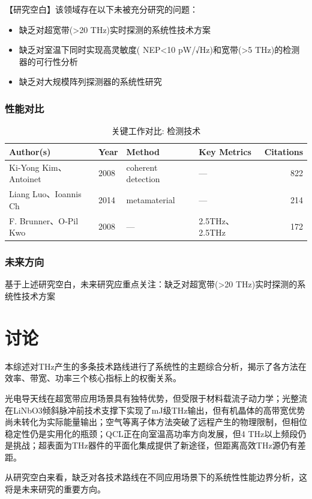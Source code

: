 \documentclass[reprint,amsmath,amssymb,aps,floatfix]{revtex4-2}
\begin{document}
\par\par{【研究空白】该领域存在以下未被充分研究的问题：}
\begin{itemize}
\item 缺乏对超宽带(>20 THz)实时探测的系统性技术方案
\item 缺乏对室温下同时实现高灵敏度( NEP<10 pW/√Hz)和宽带(>5 THz)的检测器的可行性分析
\item 缺乏对大规模阵列探测器的系统性研究
\end{itemize}

\subsubsection*{性能对比}
\begin{table}[h!]
\caption{关键工作对比: 检测技术}
\begin{tabular}{@{}llp{2.5cm}p{2.5cm}r@{}}
\hline
Author(s) & Year & Method & Key Metrics & Citations\\
\hline
Ki‐Yong Kim、Antoinet & 2008 & coherent detection & --- & 822\\
Liang Luo、Ioannis Ch & 2014 & metamaterial & --- & 214\\
F. Brunner、O‐Pil Kwo & 2008 & --- & 2.5THz、2.5THz & 172\\
\hline
\end{tabular}
\end{table}

\subsubsection*{未来方向}
基于上述研究空白，未来研究应重点关注：缺乏对超宽带(>20 THz)实时探测的系统性技术方案
\section{讨论}
\par\par{本综述对THz产生的多条技术路线进行了系统性的主题综合分析，揭示了各方法在效率、带宽、功率三个核心指标上的权衡关系。}
\par\par{光电导天线在超宽带应用场景具有独特优势，但受限于材料载流子动力学；光整流在LiNbO3倾斜脉冲前技术支撑下实现了mJ级THz输出，但有机晶体的高带宽优势尚未转化为实际能量输出；空气等离子体方法突破了远程产生的物理限制，但相位稳定性仍是实用化的瓶颈；QCL正在向室温高功率方向发展，但4 THz以上频段仍是挑战；超表面为THz器件的平面化集成提供了新途径，但距离高效THz源仍有差距。}
\par\par{从研究空白来看，缺乏对各技术路线在不同应用场景下的系统性性能边界分析，这将是未来研究的重要方向。}
\appendix
\end{document}

